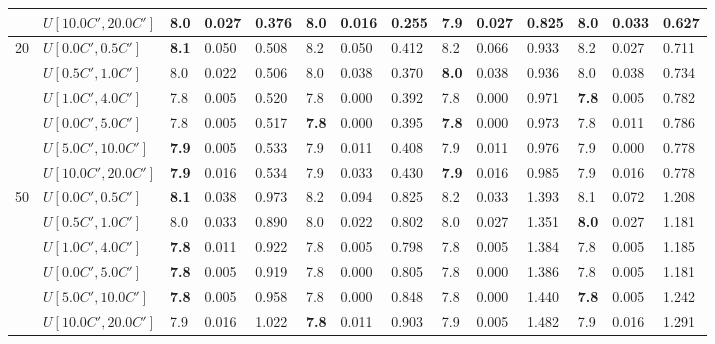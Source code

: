 \begin{table}[h]
{\begin{tabular}{|l|l||l|l|l||l|l|l||l|l|l||l|l|l|}
       & $U[10.0C',20.0C']$ & 8.0 & 0.027 & 0.376 & 8.0 & 0.016 & 0.255 & \textbf{7.9} & 0.027 & 0.825 & 8.0 & 0.033 & 0.627 \\
      \hline\hline
      \multirow{6}{*}{20} & $U[0.0C',0.5C']$ & \textbf{8.1} & 0.050 & 0.508 & 8.2 & 0.050 & 0.412 & 8.2 & 0.066 & 0.933 & 8.2 & 0.027 & 0.711 \\
       & $U[0.5C',1.0C']$ & 8.0 & 0.022 & 0.506 & 8.0 & 0.038 & 0.370 & \textbf{8.0} & 0.038 & 0.936 & 8.0 & 0.038 & 0.734 \\
       & $U[1.0C',4.0C']$ & 7.8 & 0.005 & 0.520 & 7.8 & 0.000 & 0.392 & 7.8 & 0.000 & 0.971 & \textbf{7.8} & 0.005 & 0.782 \\
       & $U[0.0C',5.0C']$ & 7.8 & 0.005 & 0.517 & \textbf{7.8} & 0.000 & 0.395 & \textbf{7.8} & 0.000 & 0.973 & 7.8 & 0.011 & 0.786 \\
       & $U[5.0C',10.0C']$ & \textbf{7.9} & 0.005 & 0.533 & 7.9 & 0.011 & 0.408 & 7.9 & 0.011 & 0.976 & 7.9 & 0.000 & 0.778 \\
       & $U[10.0C',20.0C']$ & \textbf{7.9} & 0.016 & 0.534 & 7.9 & 0.033 & 0.430 & \textbf{7.9} & 0.016 & 0.985 & 7.9 & 0.016 & 0.778 \\
      \hline\hline
      \multirow{6}{*}{50} & $U[0.0C',0.5C']$ & \textbf{8.1} & 0.038 & 0.973 & 8.2 & 0.094 & 0.825 & 8.2 & 0.033 & 1.393 & 8.1 & 0.072 & 1.208 \\
       & $U[0.5C',1.0C']$ & 8.0 & 0.033 & 0.890 & 8.0 & 0.022 & 0.802 & 8.0 & 0.027 & 1.351 & \textbf{8.0} & 0.027 & 1.181 \\
       & $U[1.0C',4.0C']$ & \textbf{7.8} & 0.011 & 0.922 & 7.8 & 0.005 & 0.798 & 7.8 & 0.005 & 1.384 & 7.8 & 0.005 & 1.185 \\
       & $U[0.0C',5.0C']$ & \textbf{7.8} & 0.005 & 0.919 & 7.8 & 0.000 & 0.805 & 7.8 & 0.000 & 1.386 & 7.8 & 0.005 & 1.181 \\
       & $U[5.0C',10.0C']$ & \textbf{7.8} & 0.005 & 0.958 & 7.8 & 0.000 & 0.848 & 7.8 & 0.000 & 1.440 & \textbf{7.8} & 0.005 & 1.242 \\
       & $U[10.0C',20.0C']$ & 7.9 & 0.016 & 1.022 & \textbf{7.8} & 0.011 & 0.903 & 7.9 & 0.005 & 1.482 & 7.9 & 0.016 & 1.291 \\
      \hline
      \end{tabular}
      }
      \label{tab:pcpn90ILPVariant}
      \end{table}
      
